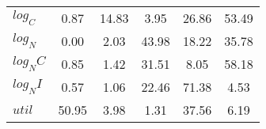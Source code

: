 \begin{center}
\begin{longtable}{lccccc}
$log_C         $	 & 	        0.87	 & 	       14.83	 & 	        3.95	 & 	       26.86	 & 	       53.49 \\ 
$log_N         $	 & 	        0.00	 & 	        2.03	 & 	       43.98	 & 	       18.22	 & 	       35.78 \\ 
$log_NC        $	 & 	        0.85	 & 	        1.42	 & 	       31.51	 & 	        8.05	 & 	       58.18 \\ 
$log_NI        $	 & 	        0.57	 & 	        1.06	 & 	       22.46	 & 	       71.38	 & 	        4.53 \\ 
$util          $	 & 	       50.95	 & 	        3.98	 & 	        1.31	 & 	       37.56	 & 	        6.19 \\ 
\end{longtable}
 \end{center}
